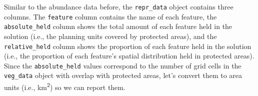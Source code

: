 \documentclass[
  12pt,
]{book}
\newenvironment{Shaded}{\begin{snugshade}}{\end{snugshade}}
\newcommand{\CommentTok}[1]{\textcolor[rgb]{0.56,0.35,0.01}{\textit{#1}}}
\newcommand{\DecValTok}[1]{\textcolor[rgb]{0.00,0.00,0.81}{#1}}
\newcommand{\FunctionTok}[1]{\textcolor[rgb]{0.00,0.00,0.00}{#1}}
\newcommand{\NormalTok}[1]{#1}
\newcommand{\OtherTok}[1]{\textcolor[rgb]{0.56,0.35,0.01}{#1}}
\newcommand{\SpecialCharTok}[1]{\textcolor[rgb]{0.00,0.00,0.00}{#1}}
\begin{document}
Similar to the abundance data before, the \texttt{repr\_data} object contains three columns. The \texttt{feature} column contains the name of each feature, the \texttt{absolute\_held} column shows the total amount of each feature held in the solution (i.e., the planning units covered by protected areas), and the \texttt{relative\_held} column shows the proportion of each feature held in the solution (i.e., the proportion of each feature's spatial distribution held in protected areas). Since the \texttt{absolute\_held} values correspond to the number of grid cells in the \texttt{veg\_data} object with overlap with protected areas, let's convert them to area units (i.e., km\textsuperscript{2}) so we can report them.

\begin{Shaded}
\end{Shaded}
\end{document}
